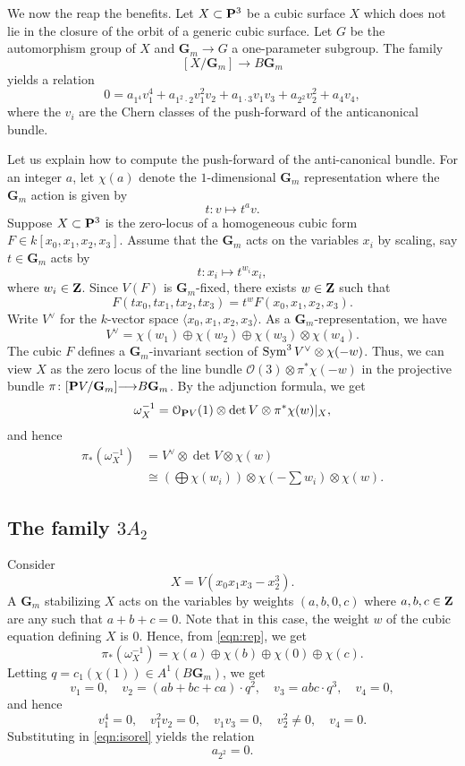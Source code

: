 \documentclass[12pt,reqno]{amsart}
\renewcommand{\to}{{\longrightarrow}}
\numberwithin{equation}{section}
\renewcommand{\O}{\mathcal O}
\newcommand{\G}{\mathbf G}
\begin{document}
We now the reap the benefits.
Let $X \subset \P^3$ be a cubic surface $X$ which does not lie in the closure of the orbit of a generic cubic surface.
Let $G$ be the automorphism group of $X$ and $\G_m \to G$ a one-parameter subgroup.
The family
\[ [X/\G_m] \to B\G_m\]
yields a relation
\begin{equation}\label{eqn:isorel}
  0 = a_{1^4}v_1^4 + a_{1^2\cdot 2} v_1^2v_2 + a_{1\cdot 3} v_1v_3 + a_{2^2}v_2^2 + a_4 v_4,
\end{equation}
where the $v_i$ are the Chern classes of the push-forward of the anticanonical bundle.

Let us explain how to compute the push-forward of the anti-canonical bundle.
For an integer $a$, let $\chi(a)$ denote the $1$-dimensional $\G_m$ representation where the $\G_m$ action is given by
\[ t \colon v \mapsto t^a v.\]
Suppose $X \subset \P^3$ is the zero-locus of a homogeneous cubic form $F \in k[x_0,x_1,x_2,x_3]$.
Assume that the $\G_m$ acts on the variables $x_i$ by scaling, say $t \in \G_m$ acts by
\[ t \colon x_i \mapsto t^{w_i}x_i,\]
where $w_i \in \Z$.
Since $V(F)$ is $\G_m$-fixed, there exists $w \in \Z$ such that
\[ F \left(t x_0, t x_1, t x_2, t x_3\right) = t^w F\left(x_0, x_1, x_2,x_3\right).\]
Write $V^\vee$ for the $k$-vector space $\langle x_0, x_1, x_2,x_3 \rangle$.
As a $\G_m$-representation, we have
\[ V^\vee = \chi(w_1) \oplus \chi(w_2) \oplus \chi(w_3) \otimes \chi(w_4).\]
The cubic $F$ defines a $\G_m$-invariant section of $\Sym^3 V^\vee \otimes \chi(-w)$.
Thus, we can view $X$ as the zero locus of the line bundle $\O(3) \otimes \pi^*\chi(-w)$ in the projective bundle $\pi \colon [\P V/\G_m] \to B\G_m$.
By the adjunction formula, we get
\[ \omega_X^{-1} = \O_{\P V}(1) \otimes \det V \otimes \pi^*\chi(w) |_X,\]
and hence
\begin{equation}\label{eqn:rep}
\begin{split}
  \pi_*\left( \omega_X^{-1} \right) &= V^\vee \otimes \det V \otimes \chi(w) \\
  &\cong \left( \bigoplus \chi(w_i)  \right) \otimes \chi\left(-\sum w_i\right) \otimes \chi(w).
\end{split}
\end{equation}

\subsection{The family $3A_2$}
Consider
\[ X = V(x_0x_1x_3 - x_2^3).\]
A $\G_m$ stabilizing $X$ acts on the variables by weights $(a,b,0,c)$ where $a,b,c \in \Z$ are any such that $a+b+c = 0$.
Note that in this case, the weight $w$ of the cubic equation defining $X$ is $0$.
Hence, from \eqref{eqn:rep}, we get
\[ \pi_*\left(\omega^{-1}_X\right) = \chi(a) \oplus \chi(b) \oplus \chi(0) \oplus \chi(c).\]
Letting $q = c_1(\chi(1)) \in A^1(B\G_m)$, we get
\[ v_1 = 0, \quad v_2 = (ab+bc+ca) \cdot q^2, \quad v_3 = abc \cdot q^3, \quad v_4 = 0,\]
and hence
\[ v_1^4 = 0, \quad v_1^2v_2 = 0, \quad v_1v_3 = 0,\quad v_2^2 \neq 0, \quad v_4 = 0.\]
Substituting in \eqref{eqn:isorel} yields the relation
\begin{equation}\label{eqn:iso1}
  a_{2^2} = 0.
\end{equation}
\end{document}
